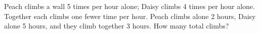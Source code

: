 Peach climbs a wall 5 times per hour alone; Daisy climbs 4 times per hour alone. Together each climbs one fewer time per hour. Peach climbs alone 2 hours, Daisy alone 5 hours, and they climb together 3 hours. How many total climbs?
